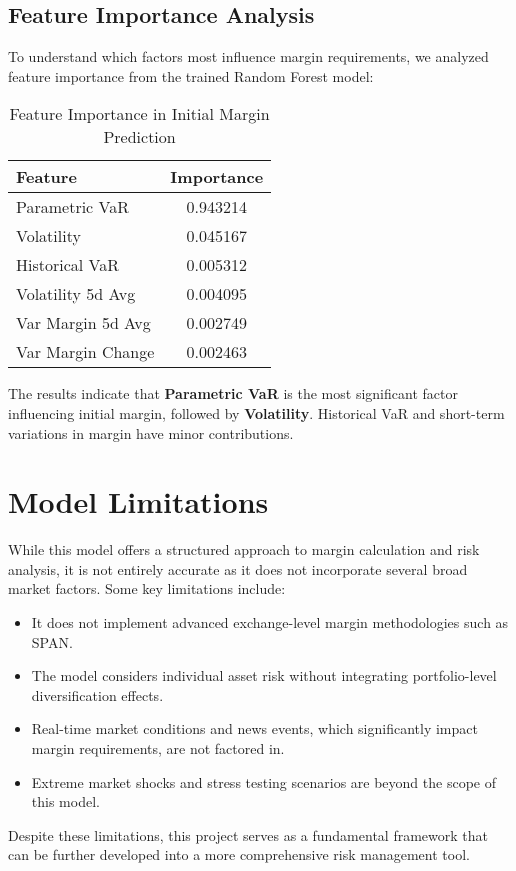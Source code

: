 \documentclass[a4paper,12pt]{article}
\begin{document}
\subsection{Feature Importance Analysis}
To understand which factors most influence margin requirements, we analyzed feature importance from the trained Random Forest model:
\begin{table}[h]
    \centering
    \begin{tabular}{lc}
    \toprule
    \textbf{Feature} & \textbf{Importance} \\
    \midrule
    Parametric VaR & 0.943214 \\
    Volatility & 0.045167 \\
    Historical VaR & 0.005312 \\
    Volatility 5d Avg & 0.004095 \\
    Var Margin 5d Avg & 0.002749 \\
    Var Margin Change & 0.002463 \\
    \bottomrule
    \end{tabular}
    \caption{Feature Importance in Initial Margin Prediction}
    \label{tab:feature_importance}
\end{table}

The results indicate that \textbf{Parametric VaR} is the most significant factor influencing initial margin, followed by \textbf{Volatility}. Historical VaR and short-term variations in margin have minor contributions.

\section{Model Limitations}
While this model offers a structured approach to margin calculation and risk analysis, it is not entirely accurate as it does not incorporate several broad market factors. Some key limitations include:
\begin{itemize}
    \item It does not implement advanced exchange-level margin methodologies such as SPAN.
    \item The model considers individual asset risk without integrating portfolio-level diversification effects.
    \item Real-time market conditions and news events, which significantly impact margin requirements, are not factored in.
    \item Extreme market shocks and stress testing scenarios are beyond the scope of this model.
\end{itemize}
Despite these limitations, this project serves as a fundamental framework that can be further developed into a more comprehensive risk management tool.
\end{document}
